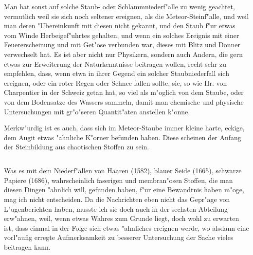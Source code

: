 \documentclass[a4paper, 11pt, oneside, polutonikogreek, german]{article}
\begin{document}
Man hat sonst auf solche Staub- oder Schlammniederf"alle zu wenig geachtet, vermutlich weil sie sich noch seltener ereignen, als die Meteor-Steinf"alle, und weil man deren "Ubereinkunft mit diesen nicht gekannt, und den Staub f"ur etwas vom Winde Herbeigef"uhrtes gehalten, und wenn ein solches Ereignis mit einer Feuererscheinung und mit Get"ose verbunden war, dieses mit Blitz und Donner verwechselt hat. Es ist aber nicht nur Physikern, sondern auch Andern, die gern etwas zur Erweiterung der Naturkenntnisse beitragen wollen, recht sehr zu empfehlen, dass, wenn etwa in ihrer Gegend ein solcher Staubniederfall sich ereignen, oder ein roter Regen oder Schnee fallen sollte, sie, so wie Hr. von Charpentier in der Schweiz getan hat, so viel als m"oglich von dem Staube, oder von dem Bodensatze des Wassers sammeln, damit man chemische und physische Untersuchungen mit gr"o"seren Quantit"aten anstellen k"onne.

Merkw"urdig ist es auch, dass sich im Meteor-Staube immer kleine harte, eckige, dem Augit etwas "ahnliche K"orner befunden haben. Diese scheinen der Anfang der Steinbildung aus chaotischen Stoffen zu sein.
\subsection{}
\paragraph{}
Was es mit dem Niederf"allen von Haaren (1582), blauer Seide (1665), schwarze Papiere (1686), wahrscheinlich faserigen und membran"osen Stoffen, die man diesen Dingen "ahnlich will, gefunden haben, f"ur eine Bewandtnis haben m"oge, mag ich nicht entscheiden. Da die Nachrichten eben nicht das Gepr"age von L"ugenberichten haben, musste ich sie doch auch in der sechsten Abteilung erw"ahnen, weil, wenn etwas Wahres zum Grunde liegt, doch wohl zu erwarten ist, dass einmal in der Folge sich etwas "ahnliches ereignen werde, wo alsdann eine vorl"aufig erregte Aufmerksamkeit zu besserer Untersuchung der Sache vieles beitragen kann.
\end{document}
